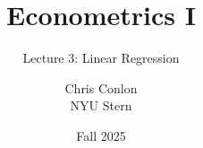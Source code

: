 






















\title[L3 - Linear Regression]{ Econometrics I}
\subtitle{Lecture 3: Linear Regression}
\author{Chris Conlon \\NYU Stern}
\date{Fall 2025}
\maketitle




